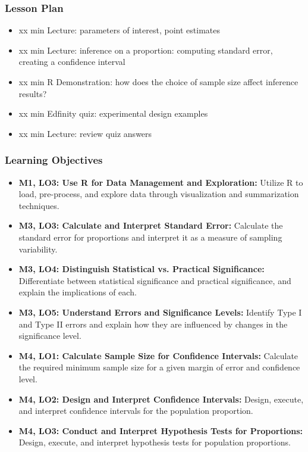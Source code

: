\begin{frame}
    \frametitle{Lesson Plan}
    \begin{itemize}
        \item xx min Lecture: parameters of interest, point estimates
        \item xx min Lecture: inference on a proportion: computing standard error, creating a confidence interval
        \item xx min R Demonstration: how does the choice of sample size affect inference results?
        \item xx min Edfinity quiz: experimental design examples
        \item xx min Lecture: review quiz answers
    \end{itemize}
\end{frame}
            
\begin{frame}
    \frametitle{Learning Objectives}
    \begin{itemize}
        \item \textbf{M1, LO3: Use R for Data Management and Exploration:} Utilize R to load, pre-process, and explore data through visualization and summarization techniques.
        \item \textbf{M3, LO3: Calculate and Interpret Standard Error:} Calculate the standard error for proportions and interpret it as a measure of sampling variability.
        \item \textbf{M3, LO4: Distinguish Statistical vs. Practical Significance:} Differentiate between statistical significance and practical significance, and explain the implications of each.
        \item \textbf{M3, LO5: Understand Errors and Significance Levels:} Identify Type I and Type II errors and explain how they are influenced by changes in the significance level.
        \item \textbf{M4, LO1: Calculate Sample Size for Confidence Intervals:} Calculate the required minimum sample size for a given margin of error and confidence level.
        \item \textbf{M4, LO2: Design and Interpret Confidence Intervals:} Design, execute, and interpret confidence intervals for the population proportion.
        \item \textbf{M4, LO3: Conduct and Interpret Hypothesis Tests for Proportions:} Design, execute, and interpret hypothesis tests for population proportions.
    \end{itemize}
\end{frame}
    

